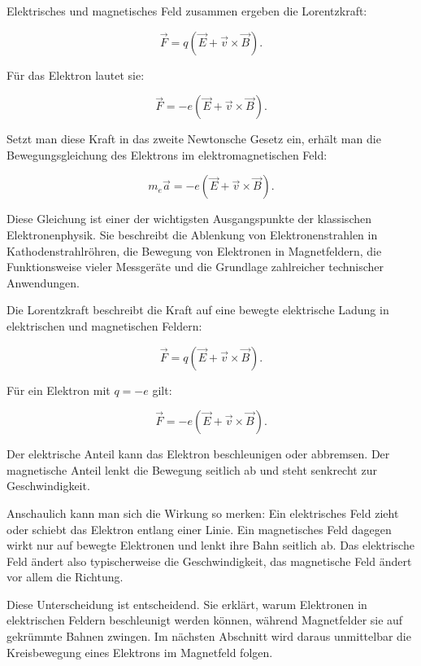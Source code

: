 Elektrisches und magnetisches Feld zusammen ergeben die Lorentzkraft:

\[
\vec{F}
=
q\left(\vec{E} + \vec{v} \times \vec{B}\right).
\]

Für das Elektron lautet sie:

\[
\vec{F}
=
-e\left(\vec{E} + \vec{v} \times \vec{B}\right).
\]

Setzt man diese Kraft in das zweite Newtonsche Gesetz ein, erhält man die
Bewegungsgleichung des Elektrons im elektromagnetischen Feld:

\[
m_e \vec{a}
=
-e\left(\vec{E} + \vec{v} \times \vec{B}\right).
\]

Diese Gleichung ist einer der wichtigsten Ausgangspunkte der klassischen
Elektronenphysik. Sie beschreibt die Ablenkung von Elektronenstrahlen in
Kathodenstrahlröhren, die Bewegung von Elektronen in Magnetfeldern, die
Funktionsweise vieler Messgeräte und die Grundlage zahlreicher technischer
Anwendungen.

\begin{PhysicsBox}
	\label{box:lorentzkraft}
	Die Lorentzkraft beschreibt die Kraft auf eine bewegte elektrische Ladung
	in elektrischen und magnetischen Feldern:
	
	\[
	\vec{F}
	=
	q\left(\vec{E} + \vec{v} \times \vec{B}\right).
	\]
	
	Für ein Elektron mit \(q=-e\) gilt:
	
	\[
	\vec{F}
	=
	-e\left(\vec{E} + \vec{v} \times \vec{B}\right).
	\]
	
	Der elektrische Anteil kann das Elektron beschleunigen oder abbremsen.
	Der magnetische Anteil lenkt die Bewegung seitlich ab und steht senkrecht
	zur Geschwindigkeit.
\end{PhysicsBox}

Anschaulich kann man sich die Wirkung so merken:
Ein elektrisches Feld zieht oder schiebt das Elektron entlang einer Linie.
Ein magnetisches Feld dagegen wirkt nur auf bewegte Elektronen und lenkt
ihre Bahn seitlich ab. Das elektrische Feld ändert also typischerweise die
Geschwindigkeit, das magnetische Feld ändert vor allem die Richtung.

Diese Unterscheidung ist entscheidend. Sie erklärt, warum Elektronen in
elektrischen Feldern beschleunigt werden können, während Magnetfelder sie
auf gekrümmte Bahnen zwingen. Im nächsten Abschnitt wird daraus unmittelbar
die Kreisbewegung eines Elektrons im Magnetfeld folgen.
